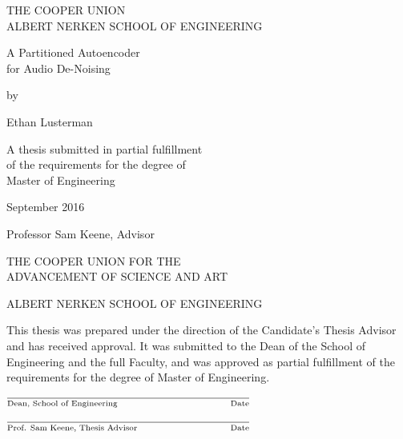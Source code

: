 \documentclass[12pt]{article}
\newcommand\tline[2]{$\underset{\text{#1}}{\text{\underline{\hspace{#2}}}}$}
\begin{document}
\thispagestyle{empty}
\begin{center}
\Large

THE COOPER UNION\\
ALBERT NERKEN SCHOOL OF ENGINEERING

\vspace{1in}

{
\LARGE
A Partitioned Autoencoder \\for Audio De-Noising

}

\vspace{1in}

by

Ethan Lusterman

\vspace*{\fill}

A thesis submitted in partial fulfillment\\
of the requirements for the degree of\\
Master of Engineering

\vspace{1in}

September 2016

\vspace{1in}

Professor Sam Keene, Advisor

\end{center}

\newpage
\thispagestyle{empty}
\begin{center}
\Large
THE COOPER UNION FOR THE \\ADVANCEMENT OF SCIENCE AND ART

\vspace{0.5in}

ALBERT NERKEN SCHOOL OF ENGINEERING

\vspace{1in}

\justify

This thesis was prepared under the direction of the Candidate's Thesis Advisor
and has received approval. It was submitted to the Dean of the School of
Engineering and the full Faculty, and was approved as partial fulfillment of
the requirements for the degree of Master of Engineering.

\raggedright

\vspace{1in}

\hfill \tline{Dean, School of Engineering \hfill Date}{3in}

\vspace{1in}

\tline{Prof. Sam Keene, Thesis Advisor \hfill Date}{3in}


\end{center}
\end{document}

